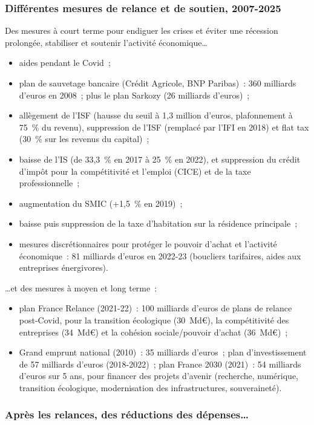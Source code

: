 \subsubsection{Différentes mesures de relance et de soutien, 2007-2025}

Des mesures à court terme pour endiguer les crises et éviter une récession prolongée,
stabiliser et soutenir l'activité économique\ldots
\begin{itemize}
  \item aides pendant le Covid~;
  \item plan de sauvetage bancaire (Crédit Agricole, BNP Paribas)~: 360 milliards
    d'euros en 2008~; plus le plan Sarkozy (26 milliards d'euros)~;
  \item allègement de l'ISF (hausse du seuil à 1,3 million d'euros, plafonnement à
    75~\% du revenu), suppression de l'ISF (remplacé par l'IFI en 2018) et flat tax
    (30~\% sur les revenus du capital)~;
  \item baisse de l'IS (de 33,3~\% en 2017 à 25~\% en 2022), et suppression du crédit
    d'impôt pour la compétitivité et l'emploi (CICE) et de la taxe professionnelle~;
  \item augmentation du SMIC (+1,5~\% en 2019)~;
  \item baisse puis suppression de la taxe d'habitation sur la résidence principale~;
  \item mesures discrétionnaires pour protéger le pouvoir d'achat et l'activité
    économique~: 81 milliards d'euros en 2022-23 (boucliers tarifaires, aides aux
    entreprises énergivores).
\end{itemize}
\ldots et des mesures à moyen et long terme~:
\begin{itemize}
  \item plan France Relance (2021-22)~: 100 milliards d'euros de plans de relance
    post-Covid, pour la transition écologique (30~Md€), la compétitivité des
    entreprises (34~Md€) et la cohésion sociale/pouvoir d'achat (36~Md€)~;
  \item Grand emprunt national (2010)~: 35 milliards d'euros~; plan d'investissement de
    57 milliards d'euros (2018-2022)~; plan France 2030 (2021)~: 54 milliards d'euros
    sur 5 ans, pour financer des projets d'avenir (recherche, numérique, transition
    écologique, modernisation des infrastructures, souveraineté).
\end{itemize}

\subsubsection{Après les relances, des réductions des dépenses\ldots}

